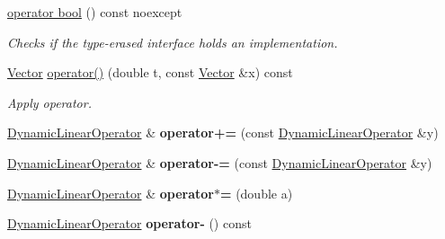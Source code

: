 \begin{DoxyCompactItemize}
\item 
\hyperlink{classSpacy_1_1DynamicLinearOperator_a8e59ff2dc6fa7f91c461c1af20bb81fb}{operator bool} () const noexcept
\begin{DoxyCompactList}\small\item\em \-Checks if the type-\/erased interface holds an implementation. \end{DoxyCompactList}\item 
\hypertarget{classSpacy_1_1DynamicLinearOperator_a436759e2a2a59d57127e317d6b809349}{\hyperlink{classSpacy_1_1Vector}{\-Vector} \hyperlink{classSpacy_1_1DynamicLinearOperator_a436759e2a2a59d57127e317d6b809349}{operator()} (double t, const \hyperlink{classSpacy_1_1Vector}{\-Vector} \&x) const }\label{classSpacy_1_1DynamicLinearOperator_a436759e2a2a59d57127e317d6b809349}

\begin{DoxyCompactList}\small\item\em \-Apply operator. \end{DoxyCompactList}\item 
\hypertarget{classSpacy_1_1DynamicLinearOperator_a6696204e09787916f1dec88319fdcdb2}{\hyperlink{classSpacy_1_1DynamicLinearOperator}{\-Dynamic\-Linear\-Operator} \& {\bfseries operator+=} (const \hyperlink{classSpacy_1_1DynamicLinearOperator}{\-Dynamic\-Linear\-Operator} \&y)}\label{classSpacy_1_1DynamicLinearOperator_a6696204e09787916f1dec88319fdcdb2}

\item 
\hypertarget{classSpacy_1_1DynamicLinearOperator_a8a7283da8c551442f8e4e0372e088f41}{\hyperlink{classSpacy_1_1DynamicLinearOperator}{\-Dynamic\-Linear\-Operator} \& {\bfseries operator-\/=} (const \hyperlink{classSpacy_1_1DynamicLinearOperator}{\-Dynamic\-Linear\-Operator} \&y)}\label{classSpacy_1_1DynamicLinearOperator_a8a7283da8c551442f8e4e0372e088f41}

\item 
\hypertarget{classSpacy_1_1DynamicLinearOperator_ae8fc6f0856bc0218b53a7371cf2928f4}{\hyperlink{classSpacy_1_1DynamicLinearOperator}{\-Dynamic\-Linear\-Operator} \& {\bfseries operator$\ast$=} (double a)}\label{classSpacy_1_1DynamicLinearOperator_ae8fc6f0856bc0218b53a7371cf2928f4}

\item 
\hypertarget{classSpacy_1_1DynamicLinearOperator_afd842124db19f3bb9716ca4bb12a4867}{\hyperlink{classSpacy_1_1DynamicLinearOperator}{\-Dynamic\-Linear\-Operator} {\bfseries operator-\/} () const }\label{classSpacy_1_1DynamicLinearOperator_afd842124db19f3bb9716ca4bb12a4867}


\end{DoxyCompactItemize}
